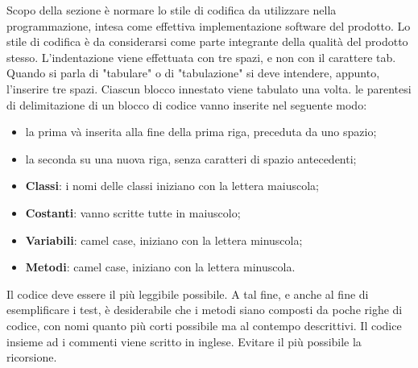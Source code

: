 	    Scopo della sezione è normare lo stile di codifica da utilizzare nella programmazione, intesa come effettiva implementazione software del prodotto. Lo stile di codifica è da considerarsi come parte integrante della qualità del prodotto stesso.
	    L'indentazione viene effettuata con tre spazi, e non con il carattere tab. Quando si parla di "tabulare" o di "tabulazione" si deve intendere, appunto, l'inserire tre spazi.
	    Ciascun blocco innestato viene tabulato una volta.
	    le parentesi di delimitazione di un blocco di codice vanno inserite nel seguente modo:
	    \begin{itemize}
	        \item la prima và inserita alla fine della prima riga, preceduta da uno spazio;
	        \item la seconda su una nuova riga, senza caratteri di spazio antecedenti;
	    \end{itemize}
	    
	    \begin{itemize}
	        \item \textbf{Classi}: i nomi delle classi iniziano con la lettera maiuscola;
	        \item \textbf{Costanti}: vanno scritte tutte in maiuscolo;
	        \item \textbf{Variabili}: camel case, iniziano con la lettera minuscola;
	        \item \textbf{Metodi}: camel case, iniziano con la lettera minuscola.
	    \end{itemize}
	    Il codice deve essere il più leggibile possibile. A tal fine, e anche al fine di esemplificare i test, è desiderabile che i metodi siano composti da poche righe di codice, con nomi quanto più corti possibile ma al contempo descrittivi.
	    Il codice insieme ad i commenti viene scritto in inglese.
	    Evitare il più possibile la ricorsione.